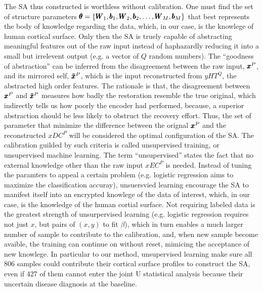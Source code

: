 The SA thus constructed is worthless without calibration. One must find the set of structure parameters $\pmb{\theta}=\{\pmb{W}_1, \pmb{b}_1, \pmb{W}_2, \pmb{b}_2, \dots, \pmb{W}_M, \pmb{b}_M\}$ that best represents the body of knowledge regarding the data, which, in our case, is the knowlege of human cortical surface. Only then the SA is truely capable of abstracting meaningful features out of the raw input instead of haphazardly reducing it into a small but irrelevent output (e.g. a vector of $Q$ random numbers). The ``goodness of abstraction'' can be inferred from the disagreement between the raw input, $\pmb{x}^P$, and its mirrored self, $\pmb{\tilde{x}}^P$, which is the input reconstructed from $yHT^Q$, the abstracted high order features. The rationale is that, the disagreement between $\pmb{x}^P$ and $\pmb{\tilde{x}}^P$ measures how badly the restoration resemble the true original, which indirectly tells us how poorly the encoder had performed, because, a superior abstraction should be less likely to obstruct the recovery effort. Thus, the set of parameter that minimize the difference between the orignal $\pmb{x}^P$ and the reconstructed $xDC^P$ will be considered the optimal configuration of the SA. The calibration guilded by such criteria is called unsupervised training, or unsupervised machine learning. The term ``unsupervised'' states the fact that no external knowledge other than the raw input $xEC^P$ is needed. Instead of tuning the paramters to appeal a certain problem (e.g. logistic regression aims to maximize the classification accuray), unsuersvied learning encourage the SA to manifest itself into an encrypted knowlege of the data of interest, which, in our case, is the knowledge of the human cortial surface. Not requiring labeled data is the greatest strength of unsurpervised learning (e.g. logistic regression requires not just $x$, but pairs of $(x,y)$ to fit $\beta$), which in turn enables a much larger number of sample to contribute to the calibration, and, when new sample become avaible, the training can continue on without reset, mimicing the acceptance of new knowlege. In particular to our method, unsupervised learning make sure all 806 samples could contribute their cortical surface profiles to construct the SA, even if 427 of them cannot enter the joint U statistical analysis because their uncertain disease diagnosis at the baseline.

